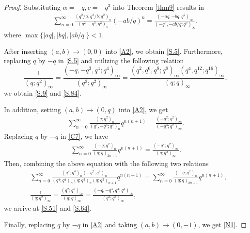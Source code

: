 \documentclass[reqno,12pt]{amsart}
\theoremstyle{remark}
\numberwithin{equation}{section}
\begin{document}
\begin{proof}
Substituting $\alpha=-q,c=-q^3$ into Theorem \ref{thm9} results in
\begin{align}
\sum_{n=0}^{\infty}\frac{\left(q^2/a,q^2/b;q^2\right)_{n}}
{\left(q^2,-q^3;q^2\right)_{n}}
\left(-ab/q\right)^n=\frac{\left(-aq,-bq;q^2\right)_{\infty}}{\left(-q^3,-ab/q;q^2\right)_{\infty}},\label{A2}
\end{align}
where $\max\{|aq|,|bq|,|ab/q|\}<1$. 

After inserting $\left(a,b\right)\to\left(0,0\right)$ into \eqref{A2}, 
we obtain \eqref{S.5}.  Furthermore, replacing $q$ by $-q$ in \eqref{S.5} and utilizing the following relation
\begin{equation*}
\frac{1}{\left(q;q^2\right)_{\infty}}
=\frac{\left(-q,-q^3,q^4;q^4\right)_{\infty}}{\left(q^2;q^2\right)_{\infty}}
=\frac{\left(q^2,q^6,q^8;q^8\right)_{\infty}
\left(q^4,q^{12};q^{16}\right)_{\infty}}{\left(q;q\right)_{\infty}},
\end{equation*}
we  obtain \eqref{S.9} and \eqref{S.84}.
  
  
In addition, setting $\left(a,b\right)\to\left(0,q\right)$ into \eqref{A2}, we get
\begin{align}
\sum_{n=0}^{\infty}\frac{\left(q;q^2\right)_n}{\left(q^2,-q^3;q^2\right)_n}q^{n(n+1)}
=\frac{\left(-q^2;q^2\right)_{\infty}}{\left(-q^3;q^2\right)_{\infty}}.\label{C7}
\end{align}
Replacing $q$ by $-q$ in \eqref{C7}, we have
\begin{align*}
\sum_{n=0}^{\infty}\frac{\left(-q;q^2\right)_n}{\left(q;q\right)_{2n+1}}q^{n(n+1)}
=\frac{\left(-q^2;q^2\right)_{\infty}}{\left(q;q^2\right)_{\infty}}.
\end{align*}
Then, combining the above equation with the following two relations
\begin{align*}
&\sum_{n=0}^{\infty}\frac{\left(q^2;q^4\right)_n\left(-q^2;q^2\right)_n}{\left(q^4;q^4\right)_n\left(q;q^2\right)_n
\left(q;q^2\right)_{n+1}}q^{n\left(n+1\right)}
=\sum_{n=0}^{\infty}\frac{\left(-q;q^2\right)_n
}{\left(q;q\right)_{2n+1}}q^{n\left(n+1\right)},\\
&\frac{1}{\left(q;q^2\right)_{\infty}}=\frac{\left(q^2;q^2\right)_{\infty}}{\left(q;q\right)_{\infty}}
=\frac{\left(-q,-q^3,q^4;q^4\right)_{\infty}}{\left(q^2;q^2\right)_{\infty}},
\end{align*}
we arrive at \eqref{S.51} and \eqref{S.64}.

Finally, replacing $q$ by $-q$ in \eqref{A2} and taking $\left(a,b\right)\to\left(0,-1\right)$, we get \ref{N1}.
\end{proof}
%
\end{document}

